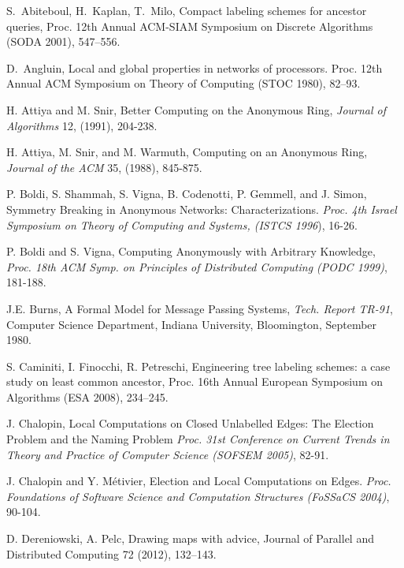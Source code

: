 \documentclass[11pt]{article}
\begin{document}
\pagebreak




\begin{thebibliography}{12}
S.~Abiteboul, H.~Kaplan, T.~Milo, Compact labeling schemes for ancestor
queries, Proc. 12th Annual ACM-SIAM Symposium on Discrete
Algorithms (SODA 2001), 547--556.

D.~Angluin, Local and global properties in networks of processors. 
Proc. 12th Annual ACM Symposium on Theory of Computing (STOC 1980), 82--93.


H. Attiya and M. Snir,
Better Computing on the Anonymous Ring,
{\em Journal of Algorithms} 12, (1991), 204-238.



H. Attiya, M. Snir, and M. Warmuth,
Computing on an Anonymous Ring,
{\em Journal of the ACM} 35, (1988), 845-875.

P. Boldi, S. Shammah, S. Vigna, B. Codenotti, P. Gemmell, and J. Simon,
Symmetry Breaking in Anonymous Networks: Characterizations. 
{\em Proc. 4th Israel Symposium on Theory of Computing and Systems,
(ISTCS 1996}), 16-26.




P. Boldi and S. Vigna,
Computing Anonymously with Arbitrary Knowledge,
{\em Proc. 18th ACM Symp. on Principles of Distributed Computing (PODC 1999)}, 181-188.

J.E. Burns, A Formal Model for Message Passing Systems,
{\em Tech. Report TR-91}, Computer Science Department,
Indiana University, Bloomington, September 1980.



S. Caminiti, I. Finocchi, R. Petreschi,
Engineering tree labeling schemes: a case study on least common ancestor,
Proc. 16th Annual European Symposium on Algorithms (ESA 2008), 234--245.

J. Chalopin,
Local Computations on Closed Unlabelled Edges: The Election Problem and the Naming Problem 
{\em Proc. 31st Conference on Current Trends in Theory and Practice of Computer Science (SOFSEM 2005)}, 82-91.

J. Chalopin and Y. M\'etivier,
Election and Local Computations on Edges.
{\em Proc. Foundations of Software Science and Computation Structures (FoSSaCS 2004)}, 90-104.



D. Dereniowski, A. Pelc, Drawing maps with advice,  Journal of Parallel and Distributed Computing 72 (2012), 132--143. 



\end{thebibliography}
\end{document}
